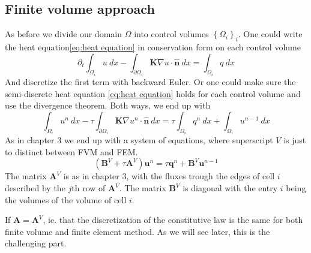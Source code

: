 \documentclass[../Main/main.tex]{subfiles}
\begin{document}
	\subsection*{Finite volume approach}
	As before we divide our domain $\Omega$ into control volumes $\left \{ \Omega_i \right \}_i$. One could write the heat equation\eqref{eq:heat equation} in conservation form on each control volume
	\begin{equation}\label{eq:semidiscrete FVM}
		\partial_t\int_{\Omega_i}u \ dx -\int_{\partial \Omega_i} \pmb{K}\nabla u \cdot \hat{\pmb{n}}\ dx = \int_{\Omega_i} q \ dx
	\end{equation}
	And discretize the first term with backward Euler. Or one could make sure the semi-discrete heat equation \eqref{eq:heat equation} holds for each control volume and use the divergence theorem. Both ways, we end up with
	\begin{equation}
		\int_{\Omega_i} u^n \ dx - \tau\int_{\partial \Omega_i} \pmb{K}\nabla u^n \cdot \hat{\pmb{n}}\ dx = \tau \int_{\Omega_i} q^n \ dx + \int_{\Omega_i} u^{n-1} \ dx
	\end{equation}
	As in chapter 3 we end up with a system of equations, where superscript $V$ is just to distinct between FVM and FEM.
	\begin{equation}\label{eq:heat fvm disc}
		(\pmb{B}^V + \tau \pmb{A}^V)\pmb{u}^n = \tau \pmb{q}^n + \pmb{B}^V\pmb{u}^{n-1}
	\end{equation}
	The matrix $\pmb{A}^V$ is as in chapter 3, with the fluxes trough the edges of cell $i$ described by the $j$th row of $\pmb{A}^V$. The matrix $\pmb{B}^V$ is diagonal with the entry $i$ being the volumes of the volume of cell $i$.

	If $\pmb{A}= \pmb{A}^V$, ie. that the discretization of the constitutive law is the same for both finite volume and finite element method. As we will see later, this is the challenging part.	
	
\end{document}
